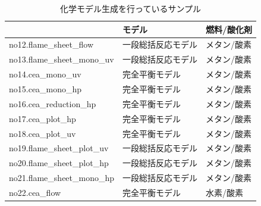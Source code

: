 \documentclass{jsarticle}
\begin{document}
\begin{table}%
\centering
\caption{化学モデル生成を行っているサンプル}
\begin{tabular}{lll}
 & モデル & 燃料/酸化剤\\
\hline
no12.flame\_sheet\_flow           & 一段総括反応モデル & メタン/酸素\\
no13.flame\_sheet\_mono\_uv       & 一段総括反応モデル & メタン/酸素\\
no14.cea\_mono\_uv                & 完全平衡モデル     & メタン/酸素\\
no15.cea\_mono\_hp                & 完全平衡モデル     & メタン/酸素\\
no16.cea\_reduction\_hp           & 完全平衡モデル     & メタン/酸素\\
no17.cea\_plot\_hp                & 完全平衡モデル     & メタン/酸素\\
no18.cea\_plot\_uv                & 完全平衡モデル     & メタン/酸素\\
no19.flame\_sheet\_plot\_uv       & 一段総括反応モデル & メタン/酸素\\
no20.flame\_sheet\_plot\_hp       & 一段総括反応モデル & メタン/酸素\\
no21.flame\_sheet\_mono\_hp       & 一段総括反応モデル & メタン/酸素\\
no22.cea\_flow                    & 完全平衡モデル     & 水素/酸素\\
\hline
\end{tabular}
\end{table}%
\end{document}
